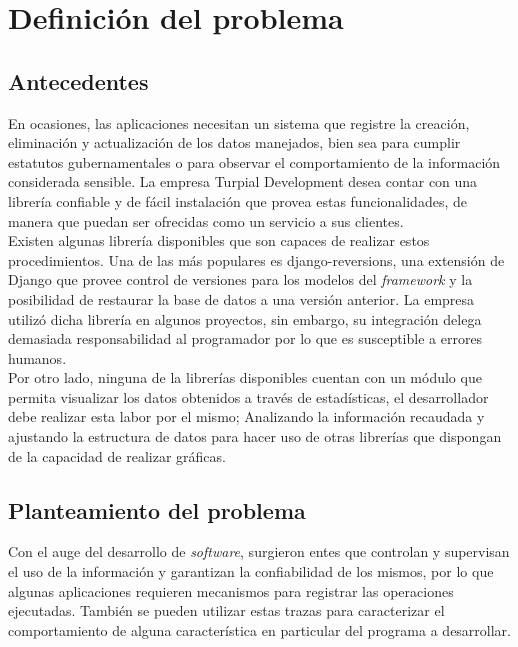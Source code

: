 \chapter{\textbf{Definición del problema}}

\thispagestyle{empty}

\section{Antecedentes}

En ocasiones, las aplicaciones necesitan un sistema que registre la creación, eliminación y actualización de los datos manejados, bien sea para cumplir estatutos gubernamentales o para observar el comportamiento de la información considerada sensible. La empresa Turpial Development desea contar con una librería confiable y de fácil instalación que provea estas funcionalidades, de manera que puedan ser ofrecidas como un servicio a sus clientes.\\

Existen algunas librería disponibles que son capaces de realizar estos procedimientos. Una de las más populares es django-reversions, una extensión de Django que provee control de versiones para los modelos del \textit{framework} y la posibilidad de restaurar la base de datos a una versión anterior. La empresa utilizó dicha librería en algunos proyectos, sin embargo, su integración delega demasiada responsabilidad al programador por lo que es susceptible a errores humanos.\\

Por otro lado, ninguna de la librerías disponibles cuentan con un módulo que permita visualizar los datos obtenidos a través de estadísticas, el desarrollador debe realizar esta labor por el mismo; Analizando la información recaudada y ajustando la estructura de datos para hacer uso de otras librerías que dispongan de la capacidad de realizar gráficas. 

\section{Planteamiento del problema}

Con el auge del desarrollo de \textit{software}, surgieron entes que controlan y supervisan el uso de la información y garantizan la confiabilidad de los mismos, por lo que algunas aplicaciones requieren mecanismos para registrar las operaciones ejecutadas. También se pueden utilizar estas trazas para caracterizar el comportamiento de alguna característica en particular del programa a desarrollar.\\


